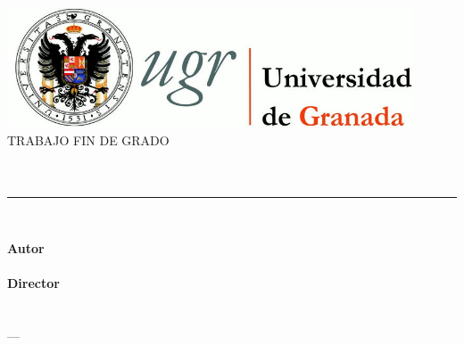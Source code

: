 \begin{titlepage}

\newlength{\centeroffset}
\setlength{\centeroffset}{-0.5\oddsidemargin}
\addtolength{\centeroffset}{0.5\evensidemargin}
\thispagestyle{empty}

\noindent\hspace*{\centeroffset}\begin{minipage}{\textwidth}

\centering
\includegraphics[width=0.9\textwidth]{imagenes/logo_ugr.jpg}\\[1.4cm]

\textsc{ \Large TRABAJO FIN DE GRADO\\[0.2cm]}
\textsc{ \myDegree }\\[1cm]
% 
{\Large \bfseries{ \myTitle }\\ }
\noindent\rule[-1ex]{\textwidth}{3pt}\\[3.5ex]
{\large\bfseries}
\end{minipage}

\vspace{2.5cm}
\noindent\hspace*{\centeroffset}\begin{minipage}{\textwidth}
\centering

\textbf{Autor}\\ {\myName}\\[2.5ex]
\textbf{Director}\\
{\myProf}\\[2cm]
\textsc{ \myFaculty }\\
\textsc{---}\\
\myTime
\end{minipage}
\end{titlepage}


